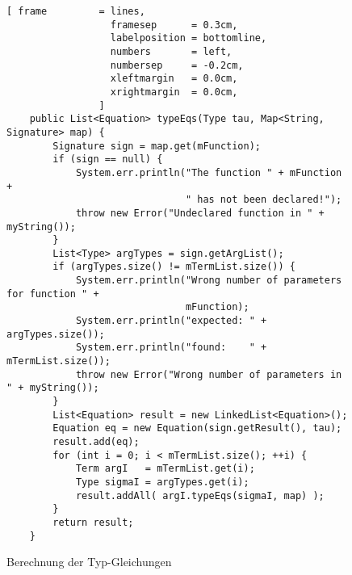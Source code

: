 \begin{figure}[!ht]
\centering
\begin{Verbatim}[ frame         = lines, 
                  framesep      = 0.3cm, 
                  labelposition = bottomline,
                  numbers       = left,
                  numbersep     = -0.2cm,
                  xleftmargin   = 0.0cm,
                  xrightmargin  = 0.0cm,
                ]
    public List<Equation> typeEqs(Type tau, Map<String, Signature> map) {
        Signature sign = map.get(mFunction);
        if (sign == null) {
            System.err.println("The function " + mFunction + 
                               " has not been declared!");
            throw new Error("Undeclared function in " + myString());
        }
        List<Type> argTypes = sign.getArgList();
        if (argTypes.size() != mTermList.size()) {
            System.err.println("Wrong number of parameters for function " + 
                               mFunction);
            System.err.println("expected: " + argTypes.size());
            System.err.println("found:    " + mTermList.size());
            throw new Error("Wrong number of parameters in " + myString());
        }
        List<Equation> result = new LinkedList<Equation>();
        Equation eq = new Equation(sign.getResult(), tau);
        result.add(eq);
        for (int i = 0; i < mTermList.size(); ++i) {
            Term argI   = mTermList.get(i);
            Type sigmaI = argTypes.get(i);
            result.addAll( argI.typeEqs(sigmaI, map) );
        }
        return result;
    }
\end{Verbatim}
\vspace*{-0.3cm}
\caption{Berechnung der Typ-Gleichungen}
\label{fig:Term:typeEqs.java}
\end{figure}

